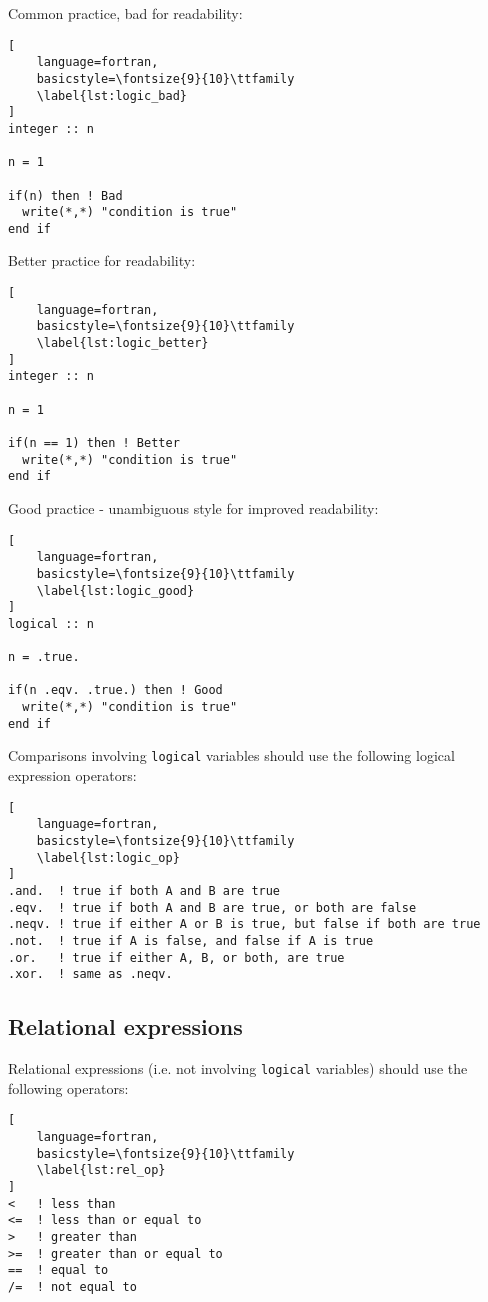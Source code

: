 \documentclass[11pt]{article}
\begin{document}
Common practice, bad for readability:
\begin{lstlisting}[
	language=fortran,
    basicstyle=\fontsize{9}{10}\ttfamily
    \label{lst:logic_bad}
]
integer :: n

n = 1

if(n) then ! Bad
  write(*,*) "condition is true"
end if
\end{lstlisting}

Better practice for readability:
\begin{lstlisting}[
	language=fortran,
    basicstyle=\fontsize{9}{10}\ttfamily
    \label{lst:logic_better}
]
integer :: n

n = 1

if(n == 1) then ! Better
  write(*,*) "condition is true"
end if
\end{lstlisting}

Good practice - unambiguous style for improved readability:

\begin{lstlisting}[
	language=fortran,
    basicstyle=\fontsize{9}{10}\ttfamily
    \label{lst:logic_good}
]
logical :: n

n = .true.

if(n .eqv. .true.) then ! Good
  write(*,*) "condition is true"
end if
\end{lstlisting}



Comparisons involving \texttt{logical} variables should use the 
following logical expression operators:
\begin{lstlisting}[
	language=fortran,
    basicstyle=\fontsize{9}{10}\ttfamily
    \label{lst:logic_op}
]
.and.  ! true if both A and B are true 
.eqv.  ! true if both A and B are true, or both are false
.neqv. ! true if either A or B is true, but false if both are true
.not.  ! true if A is false, and false if A is true
.or.   ! true if either A, B, or both, are true
.xor.  ! same as .neqv. 
\end{lstlisting}

\subsection{Relational expressions}
Relational expressions (i.e. not involving \texttt{logical} variables) should use the following operators:
\begin{lstlisting}[
	language=fortran,
    basicstyle=\fontsize{9}{10}\ttfamily
    \label{lst:rel_op}
]
<   ! less than
<=  ! less than or equal to
>   ! greater than
>=  ! greater than or equal to
==  ! equal to
/=  ! not equal to
\end{lstlisting}
\end{document}
